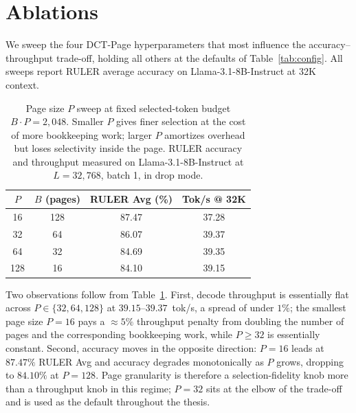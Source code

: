 \section{Ablations}\label{sec:ablations}

We sweep the four DCT-Page hyperparameters that most influence the
accuracy--throughput trade-off, holding all others at the defaults of
Table~\ref{tab:config}.  All sweeps report RULER average accuracy on
Llama-3.1-8B-Instruct at 32K context.

\begin{table}[ht]
  \centering
  \caption[Ablation: page size $P$.]
  {Page size $P$ sweep at fixed selected-token budget
   $B \cdot P = 2{,}048$.  Smaller $P$ gives finer selection at the
   cost of more bookkeeping work; larger $P$ amortizes overhead but
   loses selectivity inside the page.  RULER accuracy and throughput
   measured on Llama-3.1-8B-Instruct at $L = 32{,}768$, batch 1, in
   drop mode.}
  \label{tab:abl-page-size}
  \small
  \begin{tabular}{c c c c}
    \toprule
    $P$ & $B$ (pages) & RULER Avg (\%) & Tok/s @ 32K \\
    \midrule
    16  & 128 & 87.47 & 37.28 \\
    32  & 64  & 86.07 & 39.37 \\
    64  & 32  & 84.69 & 39.35 \\
    128 & 16  & 84.10 & 39.15 \\
    \bottomrule
  \end{tabular}
\end{table}

Two observations follow from Table~\ref{tab:abl-page-size}.  First,
decode throughput is essentially flat across $P \in \{32, 64, 128\}$
at $39.15$--$39.37$~tok/s, a spread of under $1\%$; the smallest page
size $P{=}16$ pays a $\approx 5\%$ throughput penalty from doubling
the number of pages and the corresponding bookkeeping work, while
$P \geq 32$ is essentially constant.  Second, accuracy moves in the
opposite direction: $P{=}16$ leads at $87.47\%$ RULER Avg and accuracy
degrades monotonically as $P$ grows, dropping to $84.10\%$ at
$P{=}128$.  Page granularity is therefore a selection-fidelity knob
more than a throughput knob in this regime; $P{=}32$ sits at the
elbow of the trade-off and is used as the default throughout the
thesis.

